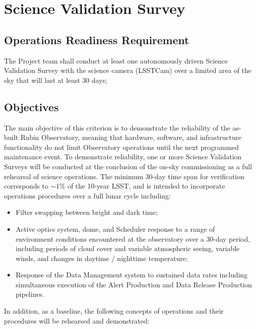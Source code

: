 \section{Science Validation Survey}  \label{sec:svs}

\subsection{Operations Readiness Requirement}

The Project team shall conduct at least one autonomously driven Science Validation Survey with the science camera (LSSTCam) over a limited area of the sky that will last at least 30 days;

\subsection{Objectives}

The main objective of this criterion is to demonstrate the reliability of the as-built Rubin Observatory, meaning that hardware, software, and infrastructure functionality do not limit Observatory operations until the next programmed maintenance event.
To demonstrate reliability, one or more Science Validation Surveys will be conducted at the conclusion of the on-sky commissioning as a full rehearsal of science operations. The minimum 30-day time span for verification corresponds to $\sim 1\%$ of the 10-year LSST, and is intended to incorporate operations procedures over a full lunar cycle including:

\begin{itemize}
\item Filter swapping between bright and dark time;
\item Active optics system, dome, and Scheduler response to a range of environment conditions encountered at the observatory over a 30-day period, including periods of cloud cover and variable atmospheric seeing, variable winds, and changes in daytime / nighttime temperature;
\item Response of the Data Management system to sustained data rates including simultaneous execution of the Alert Production and Data Release Production pipelines.
\end{itemize}

In addition, as a baseline, the following concepts of operations and their procedures will be rehearsed and demonstrated:

